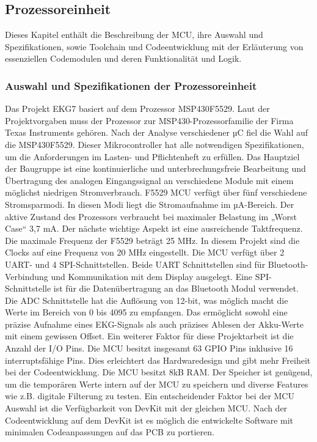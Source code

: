 
\subsection{Prozessoreinheit}

Dieses Kapitel enthält die Beschreibung der MCU, ihre Auswahl und Spezifikationen, sowie Toolchain und Codeentwicklung mit der Erläuterung von essenziellen Codemodulen und deren Funktionalität und Logik.

\subsubsection{Auswahl und Spezifikationen der Prozessoreinheit}

Das Projekt EKG7 basiert auf dem Prozessor MSP430F5529. Laut der Projektvorgaben muss der Prozessor zur MSP430-Prozessorfamilie der Firma Texas Instruments gehören. Nach der Analyse verschiedener µC fiel die Wahl auf die MSP430F5529. Dieser Mikrocontroller hat alle notwendigen Spezifikationen, um die Anforderungen im Lasten- und Pflichtenheft zu erfüllen. 
Das Hauptziel der Baugruppe ist eine kontinuierliche und unterbrechungsfreie Bearbeitung und Übertragung des analogen Eingangssignal an verschiedene Module mit einem möglichst niedrigen Stromverbrauch. 
F5529 MCU verfügt über fünf verschiedene Stromsparmodi. In diesen Modi liegt die Stromaufnahme im µA-Bereich. Der aktive Zustand des Prozessors verbraucht bei maximaler Belastung im „Worst Case“ 3,7 mA.
Der nächste wichtige Aspekt ist eine ausreichende Taktfrequenz. Die maximale Frequenz der F5529 beträgt 25 MHz. In diesem Projekt sind die Clocks auf eine Frequenz von 20 MHz eingestellt.
Die MCU verfügt über 2 UART- und 4 SPI-Schnittstellen. Beide UART Schnittstellen sind für Bluetooth-Verbindung und Kommunikation mit dem Display ausgelegt. Eine SPI-Schnittstelle ist für die Datenübertragung an das Bluetooth Modul verwendet.
Die ADC Schnittstelle hat die Auflösung von 12-bit, was möglich macht die Werte im Bereich von 0 bis 4095 zu empfangen. Das ermöglicht sowohl eine präzise Aufnahme eines EKG-Signals als auch präzises Ablesen der Akku-Werte mit einem gewissen Offset. 
Ein weiterer Faktor für diese Projektarbeit ist die Anzahl der I/O Pins. Die MCU besitzt insgesamt 63 GPIO Pins inklusive 16 interruptsfähige Pins. Dies erleichtert das Hardwaredesign und gibt mehr Freiheit bei der Codeentwicklung.
Die MCU besitzt 8kB RAM. Der Speicher ist genügend, um die temporären Werte intern auf der MCU zu speichern und diverse Features wie z.B. digitale Filterung zu testen.
Ein entscheidender Faktor bei der MCU Auswahl ist die Verfügbarkeit von DevKit mit der gleichen MCU. Nach der Codeentwicklung auf dem DevKit ist es möglich die entwickelte Software mit minimalen Codeanpassungen auf das PCB zu portieren.


